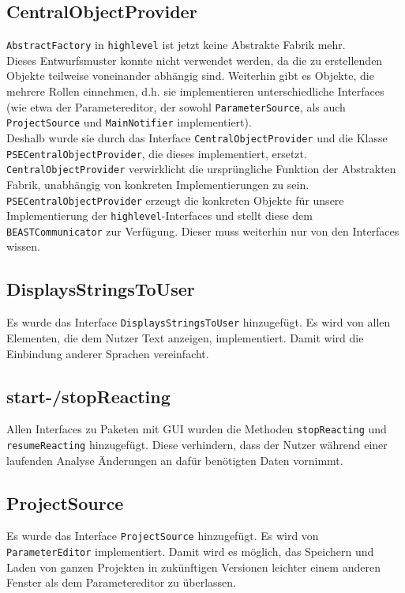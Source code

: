 \documentclass[a4paper]{scrreprt}
\begin{document}
\subsection{CentralObjectProvider}
\verb!AbstractFactory! in \verb!highlevel! ist jetzt keine Abstrakte Fabrik mehr.\\ Dieses Entwurfsmuster konnte nicht verwendet werden, da die zu erstellenden Objekte teilweise voneinander abhängig sind. Weiterhin gibt es Objekte, die mehrere Rollen einnehmen, d.h. sie implementieren unterschiedliche Interfaces (wie etwa der Parametereditor, der sowohl \verb!ParameterSource!, als auch \verb!ProjectSource! und \verb!MainNotifier! implementiert). \\
Deshalb wurde sie durch das Interface \verb!CentralObjectProvider! und die Klasse \verb!PSECentralObjectProvider!, die dieses implementiert, ersetzt. \verb!CentralObjectProvider! verwirklicht die ursprüngliche Funktion der Abstrakten Fabrik, unabhängig von konkreten Implementierungen zu sein. \\
\verb!PSECentralObjectProvider! erzeugt die konkreten Objekte für unsere Implementierung der \verb!highlevel!-Interfaces und stellt diese dem \verb!BEASTCommunicator! zur Verfügung. Dieser muss weiterhin nur von den Interfaces wissen. \\

\subsection{DisplaysStringsToUser}
Es wurde das Interface \verb!DisplaysStringsToUser! hinzugefügt. Es wird von allen Elementen, die dem Nutzer Text anzeigen, implementiert. Damit wird die Einbindung anderer Sprachen vereinfacht. \\

\subsection{start-/stopReacting}
Allen Interfaces zu Paketen mit GUI wurden die Methoden \verb!stopReacting! und \verb!resumeReacting! hinzugefügt. Diese verhindern, dass der Nutzer während einer laufenden Analyse Änderungen an dafür benötigten Daten vornimmt. \\

\subsection{ProjectSource}
Es wurde das Interface \verb!ProjectSource! hinzugefügt. Es wird von \verb!ParameterEditor! implementiert. Damit wird es möglich, das Speichern und Laden von ganzen Projekten in zukünftigen Versionen leichter einem anderen Fenster als dem Parametereditor zu überlassen. \\
\end{document}
